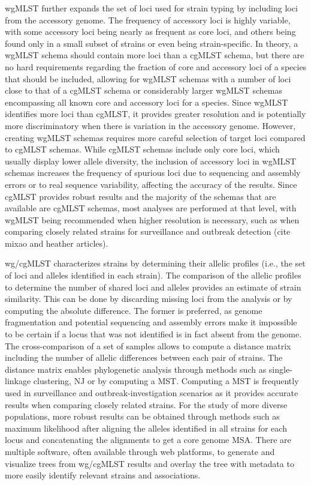 \ac{wgMLST} further expands the set of loci used for strain typing by including loci from the accessory genome. The frequency of accessory loci is highly variable, with some accessory loci being nearly as frequent as core loci, and others being found only in a small subset of strains or even being strain-specific. In theory, a \ac{wgMLST} schema should contain more loci than a \ac{cgMLST} schema, but there are no hard requirements regarding the fraction of core and accessory loci of a species that should be included, allowing for \ac{wgMLST} schemas with a number of loci close to that of a \ac{cgMLST} schema or considerably larger \ac{wgMLST} schemas encompassing all known core and accessory loci for a species. Since \ac{wgMLST} identifies more loci than \ac{cgMLST}, it provides greater resolution and is potentially more discriminatory when there is variation in the accessory genome. However, creating \ac{wgMLST} schemas requires more careful selection of target loci compared to \ac{cgMLST} schemas. While \ac{cgMLST} schemas include only core loci, which usually display lower allele diversity, the inclusion of accessory loci in \ac{wgMLST} schemas increases the frequency of spurious loci due to sequencing and assembly errors or to real sequence variability, affecting the accuracy of the results. Since \ac{cgMLST} provides robust results and the majority of the schemas that are available are \ac{cgMLST} schemas, most analyses are performed at that level, with \ac{wgMLST} being recommended when higher resolution is necessary, such as when comparing closely related strains for surveillance and outbreak detection (cite mixao and heather articles).

\ac{wg/cgMLST} characterizes strains by determining their allelic profiles (i.e., the set of loci and alleles identified in each strain). The comparison of the allelic profiles to determine the number of shared loci and alleles provides an estimate of strain similarity. This can be done by discarding missing loci from the analysis or by computing the absolute difference. The former is preferred, as genome fragmentation and potential sequencing and assembly errors make it impossible to be certain if a locus that was not identified is in fact absent from the genome. The cross-comparison of a set of samples allows to compute a distance matrix including the number of allelic differences between each pair of strains. The distance matrix enables phylogenetic analysis through methods such as single-linkage clustering, \ac{NJ} or by computing a \ac{MST}. Computing a \ac{MST} is frequently used in surveillance and outbreak-investigation scenarios as it provides accurate results when comparing closely related strains. For the study of more diverse populations, more robust results can be obtained through methods such as maximum likelihood after aligning the alleles identified in all strains for each locus and concatenating the alignments to get a core genome \ac{MSA}. There are multiple software, often available through web platforms, to generate and visualize trees from \ac{wg/cgMLST} results and overlay the tree with metadata to more easily identify relevant strains and associations.

